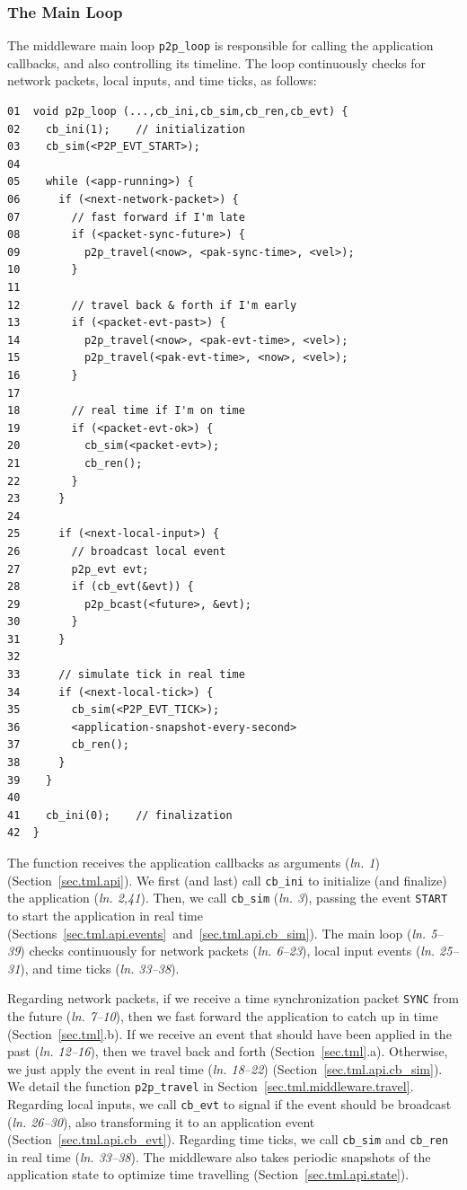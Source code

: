 \documentclass[fleqn,10pt]{SelfArx}
\newcommand{\code}[1]  {\texttt{\footnotesize{#1}}}
\newcommand{\lin}[1]{(\emph{ln. #1}\xspace)}
\begin{document}
\subsubsection{The Main Loop}
\label{sec.tml.middleware.loop}

The middleware main loop \code{p2p\_loop} is responsible for calling the
application callbacks, and also controlling its timeline.
The loop continuously checks for network packets, local inputs, and time ticks,
as follows:

{\footnotesize
\begin{verbatim}
01  void p2p_loop (...,cb_ini,cb_sim,cb_ren,cb_evt) {
02    cb_ini(1);    // initialization
03    cb_sim(<P2P_EVT_START>);
04
05    while (<app-running>) {
06      if (<next-network-packet>) {
07        // fast forward if I'm late
08        if (<packet-sync-future>) {
09          p2p_travel(<now>, <pak-sync-time>, <vel>);
10        }
11
12        // travel back & forth if I'm early
13        if (<packet-evt-past>) {
14          p2p_travel(<now>, <pak-evt-time>, <vel>);
15          p2p_travel(<pak-evt-time>, <now>, <vel>);
16        }
17
18        // real time if I'm on time
19        if (<packet-evt-ok>) {
20          cb_sim(<packet-evt>);
21          cb_ren();
22        }
23      }
24
25      if (<next-local-input>) {
26        // broadcast local event
27        p2p_evt evt;
28        if (cb_evt(&evt)) {
29          p2p_bcast(<future>, &evt);
30        }
31      }
32
33      // simulate tick in real time
34      if (<next-local-tick>) {
35        cb_sim(<P2P_EVT_TICK>);
36        <application-snapshot-every-second>
37        cb_ren();
38      }
39    }
40
41    cb_ini(0);    // finalization
42  }
\end{verbatim}
}

The function receives the application callbacks as arguments \lin{1}
(Section~\ref{sec.tml.api}).
We first (and last) call \code{cb\_ini} to initialize (and finalize) the
application \lin{2,41}.
Then, we call \code{cb\_sim} \lin{3}, passing the event \code{START} to start
the application in real time
(Sections~\ref{sec.tml.api.events}~and~\ref{sec.tml.api.cb_sim}).
The main loop \lin{5--39} checks continuously for network packets \lin{6--23},
local input events \lin{25--31}, and time ticks \lin{33--38}.

Regarding network packets, if we receive a time synchronization packet
\code{SYNC} from the future \lin{7--10}, then we fast forward the application
to catch up in time (Section~\ref{sec.tml}.b).
If we receive an event that should have been applied in the past \lin{12--16},
then we travel back and forth (Section~\ref{sec.tml}.a).
Otherwise, we just apply the event in real time \lin{18--22}
(Section~\ref{sec.tml.api.cb_sim}).
We detail the function \code{p2p\_travel} in
Section~\ref{sec.tml.middleware.travel}.
%
Regarding local inputs, we call \code{cb\_evt} to signal if the event should be
broadcast \lin{26--30}, also transforming it to an application event
(Section~\ref{sec.tml.api.cb_evt}).
%
Regarding time ticks, we call \code{cb\_sim} and \code{cb\_ren} in real time
\lin{33--38}.
The middleware also takes periodic snapshots of the application state to
optimize time travelling (Section~\ref{sec.tml.api.state}).
\end{document}
